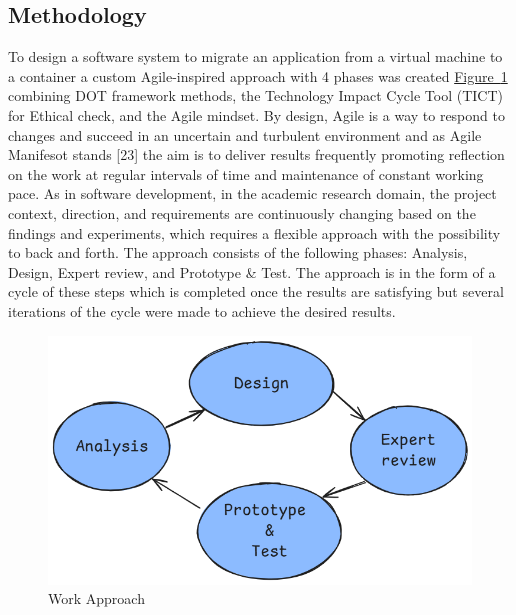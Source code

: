 \documentclass{article}
\newcommand{\FigRef}[1]{\hyperref[#1]{Figure~\ref{#1}}}
\begin{document}
\begin{multicols}{2}
\section{Methodology}
To design a software system to migrate an application from a virtual machine to a container a custom Agile-inspired approach with 4 phases was created \FigRef{fig:work_approach} combining DOT framework methods, the Technology Impact Cycle Tool (TICT) for Ethical check, and the Agile mindset. By design, Agile is a way to respond to changes and succeed in an uncertain and turbulent environment and as Agile Manifesot stands [23] the aim is to deliver results frequently promoting reflection on the work at regular intervals of time and maintenance of constant working pace. As in software development, in the academic research domain, the project context, direction, and requirements are continuously changing based on the findings and experiments, which requires a flexible approach with the possibility to back and forth. The approach consists of the following phases: Analysis, Design, Expert review, and Prototype \& Test. The approach is in the form of a cycle of these steps which is completed once the results are satisfying but several iterations of the cycle were made to achieve the desired results.

\begin{figure}[H]
    \centering
    \includegraphics[width=\linewidth]{images/approach.png}
    \caption{Work Approach}
    \label{fig:work_approach}
\end{figure}


\end{multicols}
\end{document}
